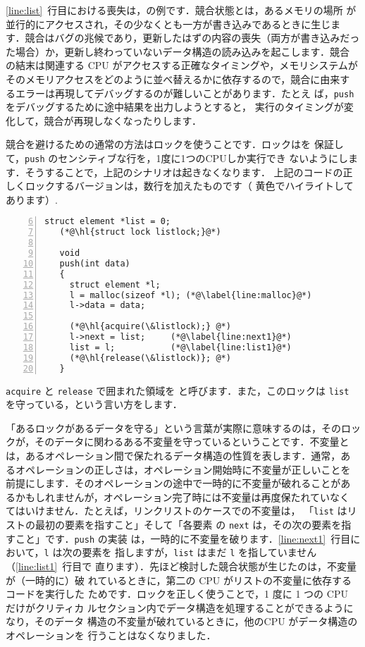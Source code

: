 \ref{line:list}~行目における喪失は，の例です．競合状態とは，あるメモリの場所
が並行的にアクセスされ，その少なくとも一方が書き込みであるときに生じま
す．競合はバグの兆候であり，更新したはずの内容の喪失（両方が書き込みだっ
た場合）か，更新し終わっていないデータ構造の読み込みを起こします．競合
の結末は関連する CPU がアクセスする正確なタイミングや，メモリシステムが
そのメモリアクセスをどのように並べ替えるかに依存するので，競合に由来す
るエラーは再現してデバッグするのが難しいことがあります．たとえ
ば，\lstinline{push} をデバッグするために途中結果を出力しようとすると，
実行のタイミングが変化して，競合が再現しなくなったりします．

競合を避けるための通常の方法はロックを使うことです．ロックはを
保証して，\lstinline{push} のセンシティブな行を，1度に1つのCPUしか実行でき
ないようにします．そうすることで，上記のシナリオは起きなくなります．
上記のコードの正しくロックするバージョンは，数行を加えたものです（
黄色でハイライトしてあります）. 
\begin{lstlisting}[numbers=left,firstnumber=6]
   struct element *list = 0;
   (*@\hl{struct lock listlock;}@*)
    	
   void
   push(int data)
   {
     struct element *l;
     l = malloc(sizeof *l); (*@\label{line:malloc}@*)
     l->data = data;
   
     (*@\hl{acquire(\&listlock);} @*)
     l->next = list;     (*@\label{line:next1}@*)
     list = l;           (*@\label{line:list1}@*)
     (*@\hl{release(\&listlock)}; @*)
   }
\end{lstlisting}
\lstinline{acquire} と \lstinline{release} で囲まれた領域を
と呼びます．また，このロックは 
\lstinline{list} を守っている，という言い方をします．

「あるロックがあるデータを守る」という言葉が実際に意味するのは，そのロッ
クが，そのデータに関わるある不変量を守っているということです．不変量と
は，あるオペレーション間で保たれるデータ構造の性質を表します．通常，あ
るオペレーションの正しさは，オペレーション開始時に不変量が正しいことを
前提にします．そのオペレーションの途中で一時的に不変量が破れることがあ
るかもしれませんが，オペレーション完了時には不変量は再度保たれていなく
てはいけません．たとえば，リンクリストのケースでの不変量は，
「\lstinline{list} はリストの最初の要素を指すこと」そして「各要素
の \lstinline{next} は，その次の要素を指すこと」です．\lstinline{push} の実装
は，一時的に不変量を破ります．\ref{line:next1}~行目において，\lstinline{l} は次の要素を
指しますが，\lstinline{list} はまだ \lstinline{l} を指していません（\ref{line:list1}~行目で
直ります）．先ほど検討した競合状態が生じたのは，不変量が（一時的に）破
れているときに，第二の CPU がリストの不変量に依存するコードを実行した
ためです．ロックを正しく使うことで，1 度に 1 つの CPU だけがクリティカ
ルセクション内でデータ構造を処理することができるようになり，そのデータ
構造の不変量が破れているときに，他のCPU がデータ構造のオペレーションを
行うことはなくなりました．

